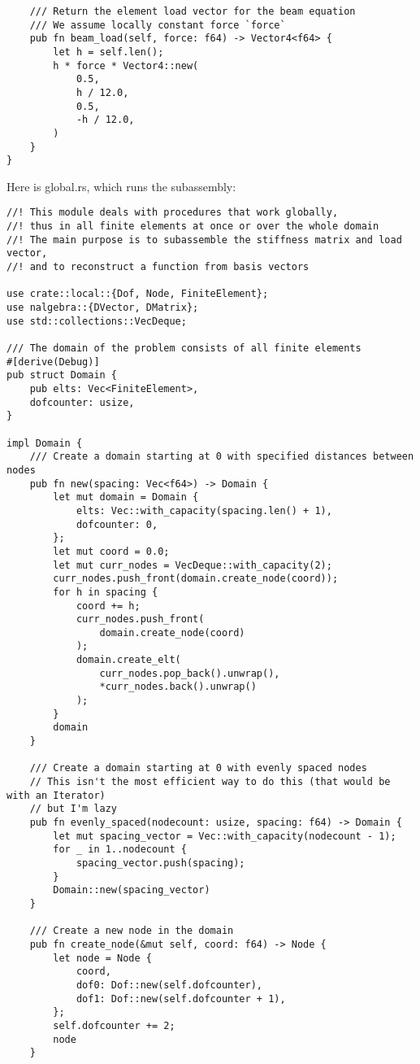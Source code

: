 \documentclass[10pt]{article}
\theoremstyle{definition}
\begin{document}
\begin{verbatim}
    /// Return the element load vector for the beam equation
    /// We assume locally constant force `force`
    pub fn beam_load(self, force: f64) -> Vector4<f64> {
        let h = self.len();
        h * force * Vector4::new(
            0.5,
            h / 12.0,
            0.5,
            -h / 12.0,
        )
    }
}
\end{verbatim}

Here is global.rs, which runs the subassembly:

\begin{verbatim}
//! This module deals with procedures that work globally,
//! thus in all finite elements at once or over the whole domain
//! The main purpose is to subassemble the stiffness matrix and load vector,
//! and to reconstruct a function from basis vectors

use crate::local::{Dof, Node, FiniteElement};
use nalgebra::{DVector, DMatrix};
use std::collections::VecDeque;

/// The domain of the problem consists of all finite elements
#[derive(Debug)]
pub struct Domain {
    pub elts: Vec<FiniteElement>,
    dofcounter: usize,
}

impl Domain {
    /// Create a domain starting at 0 with specified distances between nodes
    pub fn new(spacing: Vec<f64>) -> Domain {
        let mut domain = Domain {
            elts: Vec::with_capacity(spacing.len() + 1),
            dofcounter: 0,
        };
        let mut coord = 0.0;
        let mut curr_nodes = VecDeque::with_capacity(2);
        curr_nodes.push_front(domain.create_node(coord));
        for h in spacing {
            coord += h;
            curr_nodes.push_front(
                domain.create_node(coord)
            );
            domain.create_elt(
                curr_nodes.pop_back().unwrap(),
                *curr_nodes.back().unwrap()
            );
        }
        domain
    }

    /// Create a domain starting at 0 with evenly spaced nodes
    // This isn't the most efficient way to do this (that would be with an Iterator)
    // but I'm lazy
    pub fn evenly_spaced(nodecount: usize, spacing: f64) -> Domain {
        let mut spacing_vector = Vec::with_capacity(nodecount - 1);
        for _ in 1..nodecount {
            spacing_vector.push(spacing);
        }
        Domain::new(spacing_vector)
    }

    /// Create a new node in the domain
    pub fn create_node(&mut self, coord: f64) -> Node {
        let node = Node {
            coord,
            dof0: Dof::new(self.dofcounter),
            dof1: Dof::new(self.dofcounter + 1),
        };
        self.dofcounter += 2;
        node
    }


\end{verbatim}
\end{document}

